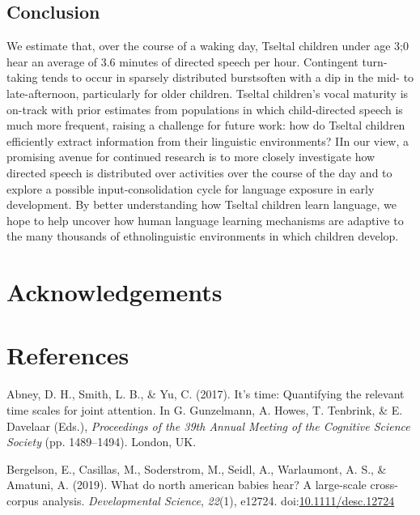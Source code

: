 \documentclass[floatsintext,man]{apa6}
\theoremstyle{definition}
\theoremstyle{definition}
\theoremstyle{definition}
\theoremstyle{remark}
\begin{document}
\subsection{Conclusion}\label{disc-conclusion}

We estimate that, over the course of a waking day, Tseltal children
under age 3;0 hear an average of 3.6 minutes of directed speech per
hour. Contingent turn-taking tends to occur in sparsely distributed
burstsoften with a dip in the mid- to late-afternoon, particularly for
older children. Tseltal children's vocal maturity is on-track with prior
estimates from populations in which child-directed speech is much more
frequent, raising a challenge for future work: how do Tseltal children
efficiently extract information from their linguistic environments? IIn
our view, a promising avenue for continued research is to more closely
investigate how directed speech is distributed over activities over the
course of the day and to explore a possible input-consolidation cycle
for language exposure in early development. By better understanding how
Tseltal children learn language, we hope to help uncover how human
language learning mechanisms are adaptive to the many thousands of
ethnolinguistic environments in which children develop.

\section{Acknowledgements}\label{acknowledgements}

\newpage

\section{References}\label{refs}

\begingroup
\setlength{\parindent}{-0.5in} \setlength{\leftskip}{0.5in}

\hypertarget{refs}{}
\hypertarget{ref-abney2017time}{}
Abney, D. H., Smith, L. B., \& Yu, C. (2017). It's time: Quantifying the
relevant time scales for joint attention. In G. Gunzelmann, A. Howes, T.
Tenbrink, \& E. Davelaar (Eds.), \emph{Proceedings of the 39th Annual
Meeting of the Cognitive Science Society} (pp. 1489--1494). London, UK.

\hypertarget{ref-bergelsoncasillas2019what}{}
Bergelson, E., Casillas, M., Soderstrom, M., Seidl, A., Warlaumont, A.
S., \& Amatuni, A. (2019). What do north american babies hear? A
large-scale cross-corpus analysis. \emph{Developmental Science},
\emph{22}(1), e12724.
doi:\href{https://doi.org/10.1111/desc.12724}{10.1111/desc.12724}
\end{document}

